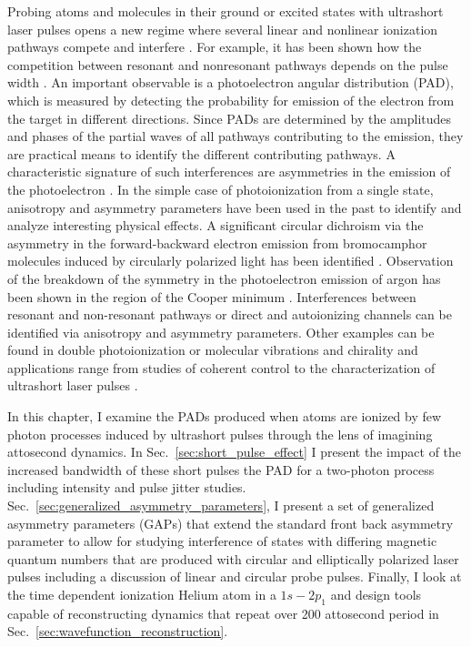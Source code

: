Probing atoms and molecules in their ground or excited states with ultrashort laser pulses opens a new regime where several linear and nonlinear ionization pathways compete and interfere \cite{ishikawa2012,ma2013,grum-grzhimailo2015,douguet2016,hofbrucker2018,boll2019,wang2019,venzke2020_ionization}. For example, it has been shown how the competition between resonant and nonresonant pathways depends on the pulse width \cite{ishikawa2012}. An important observable is a photoelectron angular distribution (PAD), which is measured by detecting the probability for emission of the electron from the target in different directions. Since PADs are determined by the amplitudes and phases of the partial waves of all pathways contributing to the emission, they are practical means to identify the different contributing pathways. A characteristic signature of such interferences are asymmetries in the emission of the photoelectron \cite{yin1992}. In the simple case of photoionization from a single state, anisotropy and asymmetry parameters have been used in the past to identify and analyze interesting physical effects. A significant circular dichroism via the asymmetry in the forward-backward electron emission from bromocamphor molecules induced by circularly polarized light has been identified  \cite{bowering2001}. Observation of the breakdown of the symmetry in the photoelectron emission of argon has been shown in the region of the Cooper minimum \cite{ilchen2018}. Interferences between resonant and non-resonant pathways \cite{ishikawa2012} or direct and autoionizing channels \cite{cirelli2018} can be identified via anisotropy and asymmetry parameters. Other examples can be found in double photoionization \cite{maulbetsch1992} or molecular vibrations and chirality \cite{garcia2013} and applications range from studies of coherent control \cite{prince2016} to the characterization of ultrashort laser pulses \cite{chelkowski2002}.

In this chapter, I examine the PADs produced when atoms are ionized by few photon processes induced by ultrashort pulses through the lens of imagining attosecond dynamics. In Sec.~\ref{sec:short_pulse_effect} I present the impact of the increased bandwidth of these short pulses the PAD for a two-photon process including intensity and pulse jitter studies. Sec.~\ref{sec:generalized_asymmetry_parameters}, I present a set of generalized asymmetry parameters (GAPs) that extend the standard front back asymmetry parameter to allow for studying interference of states with differing magnetic quantum numbers that are produced with circular and elliptically polarized laser pulses including a discussion of linear and circular probe pulses. Finally, I look at the time dependent ionization Helium atom in a $1s-2p_1$ and design tools capable of reconstructing dynamics that repeat over 200 attosecond period in Sec.~\ref{sec:wavefunction_reconstruction}.


